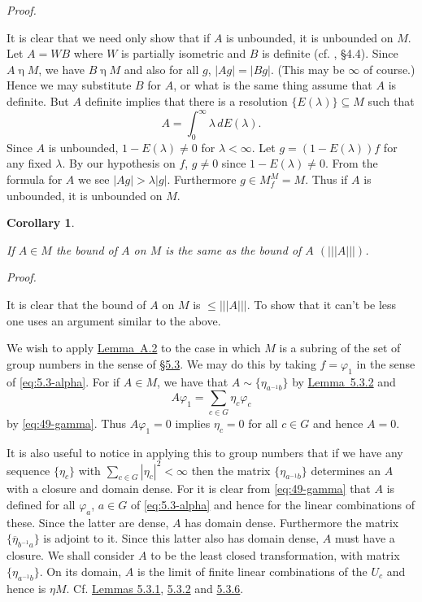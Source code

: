 \documentclass[b5paper,twoside]{article}
\makeatletter
\newcommand{\MvNSetCurrentLabel}[2]{%
  \edef\@currentlabel{#1}%
  \edef\@currentlabelname{#2}%
}
\newcommand{\MvNTargetLabel}[3]{%
  \phantomsection
  \begingroup
    \MvNSetCurrentLabel{#2}{#3}%
    \label{#1}%
  \endgroup
}
\newcommand{\secref}[2]{\hyperref[#1]{\mbox{\S#2}}}
\newcommand{\lemref}[2]{\hyperref[#1]{\mbox{Lemma~#2}}}
\theoremstyle{mvnplain}
\newtheorem*{corollary}{Corollary}
\renewenvironment{proof}[1][Proof]{%
  \par\addvspace{0.35\baselineskip}%
  \noindent\textit{#1.}\ \normalfont\ignorespaces
}{%
  \par\addvspace{0.35\baselineskip}%
}
\newcommand{\M}{\mathbf M}
\newcommand{\OpNorm}[1]{\left\lvert\left\lvert\left\lvert#1\right\rvert\right\rvert\right\rvert}
\def\M{M}%
\def\mathfrak#1{#1}%
\makeatother
\begin{document}
\begin{proof}
It is clear that we need only show that if $A$ is unbounded, it is unbounded
on $\mathfrak M$. Let $A=WB$ where $W$ is partially isometric and $B$ is
definite (cf. \cite{ref5}, \S4.4). Since $A\mathbin{\eta}\M$, we have
$B\mathbin{\eta}\M$ and also for all $g$, $|Ag|=|Bg|$. (This may be $\infty$
of course.) Hence we may substitute $B$ for $A$, or what is the same thing
assume that $A$ is definite. But $A$ definite implies that there is a
resolution $\{E(\lambda)\}\subseteq\M$ such that
\[
  A=\int_0^\infty\lambda\,dE(\lambda).
\]
Since $A$ is unbounded, $1-E(\lambda)\ne0$ for $\lambda<\infty$. Let
$g=(1-E(\lambda))f$ for any fixed $\lambda$. By our hypothesis on $f$,
$g\ne0$ since $1-E(\lambda)\ne0$. From the formula for $A$ we see
$|Ag|>\lambda|g|$. Furthermore $g\in\mathfrak M_f^{\M}=\mathfrak M$. Thus if
$A$ is unbounded, it is unbounded on $\mathfrak M$.
\end{proof}

\begin{corollary}\MvNTargetLabel{cor:A.2}{}{Corollary}
If $A\in\M$ the bound of $A$ on $\mathfrak M$ is the same as the bound of
$A$ $(\OpNorm{A})$.
\end{corollary}
\begin{proof}
It is clear that the bound of $A$ on $\mathfrak M$ is $\leq\OpNorm{A}$. To
show that it can't be less one uses an argument similar to the above.
\end{proof}

We wish to apply \lemref{lem:A.2}{A.2} to the case in which $\M$ is a subring
of the set of group numbers in the sense of \secref{sec:5.3}{5.3}. We may do
this by taking $f=\varphi_1$ in the sense of \eqref{eq:5.3-alpha}. For if $A\in\M$,
we have that $A\sim\{\eta_{a^{-1}b}\}$ by \lemref{lem:5.3.2}{5.3.2} and
\[
  A\varphi_1=\sum_{c\in\mathfrak G}\eta_c\varphi_c
\]
by \eqref{eq:49-gamma}. Thus $A\varphi_1=0$ implies $\eta_c=0$ for all
$c\in\mathfrak G$ and hence $A=0$.

It is also useful to notice in applying this to group numbers that if we have
any sequence $\{\eta_c\}$ with $\sum_{c\in\mathfrak G}|\eta_c|^2<\infty$ then
the matrix $\{\eta_{a^{-1}b}\}$ determines an $A$ with a closure and domain
dense. For it is clear from \eqref{eq:49-gamma} that $A$ is defined for all
$\varphi_a$, $a\in\mathfrak G$ of \eqref{eq:5.3-alpha} and hence for the linear
combinations of these. Since the latter are dense, $A$ has domain dense.
Furthermore the matrix $\{\overline{\eta}_{b^{-1}a}\}$ is adjoint to it. Since
this latter also has domain dense, $A$ must have a closure. We shall consider
$A$ to be the least closed transformation, with matrix
$\{\eta_{a^{-1}b}\}$. On its domain, $A$ is the limit of finite linear
combinations of the $U_c$ and hence is $\mathbin{\eta}\M$. Cf.
\hyperref[lem:5.3.1]{Lemmas 5.3.1},
\hyperref[lem:5.3.2]{5.3.2} and \hyperref[lem:5.3.6]{5.3.6}.
\end{document}
